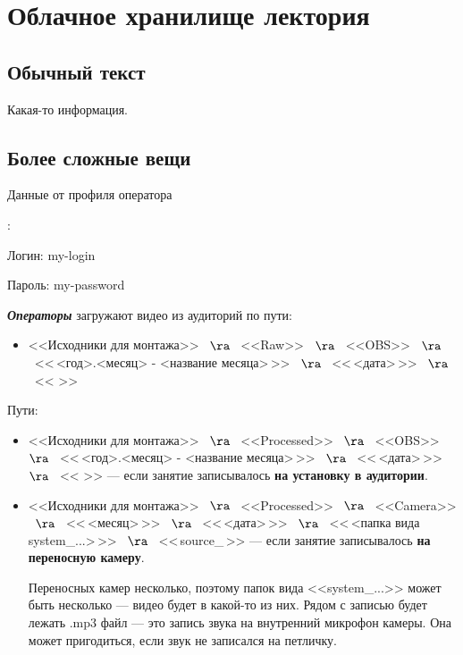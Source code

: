 \section{Облачное хранилище лектория}\label{sec:cloud-storage}

\subsection{Обычный текст}

Какая-то информация.

\subsection{Более сложные вещи}

\hypertarget{lectory-operator-profile}{Данные от профиля оператора}:
\par\hspace{10pt} Логин: my-login
\vspace{-5pt}
\par\hspace{10pt} Пароль: my-password

\vspace{5pt}

\textit{\textbf{Операторы}} загружают видео из аудиторий по пути:
\begin{itemize}
  \item <<Исходники для монтажа>> \ $\ra$ \ <<Raw>> \ $\ra$ \ <<OBS>> \ $\ra$ \ <<\,<год>.<месяц> - <название месяца>\,>> \ $\ra$ \ <<\,<дата>\,>> \ $\ra$ \ <<\,<название предмета и ФИО лектора>\,>>
\end{itemize}

Пути:
\begin{itemize}
  \item <<Исходники для монтажа>> \ $\ra$ \ <<Processed>> \ $\ra$ \ <<OBS>> \ $\ra$ \ <<\,<год>.<месяц> - <название месяца>\,>> \ $\ra$ \ <<\,<дата>\,>> \ $\ra$ \ <<\,<название предмета и ФИО лектора>\,>> --- если занятие записывалось \textbf{на установку в аудитории}.

  \item <<Исходники для монтажа>> \ $\ra$ \ <<Processed>> \ $\ra$ \ <<Camera>> \ $\ra$ \ <<\,<месяц>\,>> \ $\ra$ \ <<\,<дата>\,>> \ $\ra$ \ <<\,<папка вида system\_...>\,>> \ $\ra$ \ <<\,source\_<время лекции>\,>> --- если занятие записывалось \textbf{на переносную камеру}.

        Переносных камер несколько, поэтому папок вида <<system\_...>> может быть несколько --- видео будет в какой-то из них. Рядом с записью будет лежать \textsf{.mp3} файл --- это запись звука на внутренний микрофон камеры. Она может пригодиться, если звук не записался на петличку.
\end{itemize}

